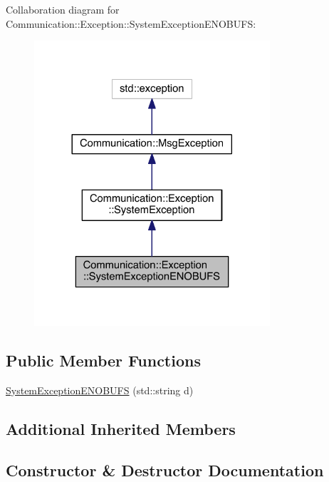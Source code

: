 Collaboration diagram for Communication\+:\+:Exception\+:\+:System\+Exception\+E\+N\+O\+B\+U\+F\+S\+:\nopagebreak
\begin{figure}[H]
\begin{center}
\leavevmode
\includegraphics[width=248pt]{class_communication_1_1_exception_1_1_system_exception_e_n_o_b_u_f_s__coll__graph}
\end{center}
\end{figure}
\subsection*{Public Member Functions}
\begin{DoxyCompactItemize}
\item 
\hyperlink{class_communication_1_1_exception_1_1_system_exception_e_n_o_b_u_f_s_abb2cfd3cf23901ba938dae06efab1433}{System\+Exception\+E\+N\+O\+B\+U\+F\+S} (std\+::string d)
\end{DoxyCompactItemize}
\subsection*{Additional Inherited Members}


\subsection{Constructor \& Destructor Documentation}
\hypertarget{class_communication_1_1_exception_1_1_system_exception_e_n_o_b_u_f_s_abb2cfd3cf23901ba938dae06efab1433}{}
